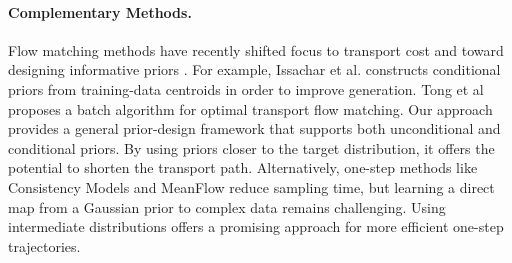 \paragraph{Complementary Methods. } 
Flow matching methods \citep{lipman2023flow} have recently shifted focus to transport cost and toward designing informative priors \citep{issachar2024designing, tong2024improving, kornilov2024optimal, feng2025on}. For example, Issachar et al. \citep{issachar2024designing} constructs conditional priors from training-data centroids in order to improve generation. Tong et al \citep{tong2024improving} proposes a batch algorithm for optimal transport flow matching.
Our approach provides a general prior-design framework that supports both unconditional and conditional priors. 
By using priors closer to the target distribution, it offers the potential to shorten the transport path.
Alternatively, one-step methods like Consistency Models \citep{song2023consistency} and MeanFlow \citep{geng2025mean} reduce sampling time, but learning a direct map from a Gaussian prior to complex data remains challenging. Using intermediate distributions offers a promising approach for more efficient one-step trajectories.